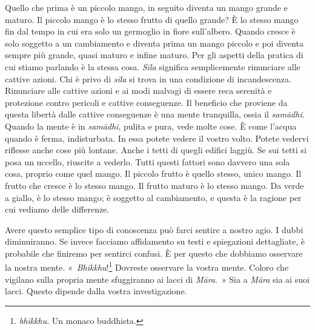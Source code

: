 Quello che prima è un piccolo mango, in seguito diventa un mango grande
e maturo. Il piccolo mango è lo stesso frutto di quello grande? È lo
stesso mango fin dal tempo in cui era solo un germoglio in fiore
sull'albero. Quando cresce è solo soggetto a un cambiamento e diventa
prima un mango piccolo e poi diventa sempre più grande, quasi maturo e
infine maturo. Per gli aspetti della pratica di cui stiamo parlando è la
stessa cosa. \emph{Sīla} significa semplicemente rinunciare alle cattive
azioni. Chi è privo di \emph{sīla} si trova in una condizione di
incandescenza. Rinunciare alle cattive azioni e ai modi malvagi di
essere reca serenità e protezione contro pericoli e cattive conseguenze.
Il beneficio che proviene da questa libertà dalle cattive conseguenze è
una mente tranquilla, ossia il \emph{samādhi}. Quando la mente è in
\emph{samādhi}, pulita e pura, vede molte cose. È come l'acqua quando è
ferma, indisturbata. In essa potete vedere il vostro volto. Potete
vedervi riflesse anche cose più lontane. Anche i tetti di quegli edifici
laggiù. Se sui tetti si posa un uccello, riuscite a vederlo. Tutti
questi fattori sono davvero una sola cosa, proprio come quel mango. Il
piccolo frutto è quello stesso, unico mango. Il frutto che cresce è lo
stesso mango. Il frutto maturo è lo stesso mango. Da verde a giallo, è
lo stesso mango; è soggetto al cambiamento, e questa è la ragione per
cui vediamo delle differenze.

Avere questo semplice tipo di conoscenza può farci sentire a nostro
agio. I dubbi diminuiranno. Se invece facciamo affidamento su testi e
spiegazioni dettagliate, è probabile che finiremo per sentirci confusi.
È per questo che dobbiamo osservare la nostra mente.
«~\emph{Bhikkhu}!\footnote{\emph{bhikkhu}. Un monaco buddhista.}
Dovreste osservare la vostra mente. Coloro che vigilano sulla propria
mente sfuggiranno ai lacci di \emph{Māra}.~» Sia a \emph{Māra} sia ai
suoi lacci. Questo dipende dalla vostra investigazione.

